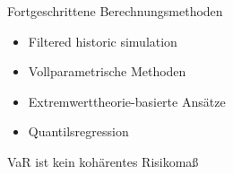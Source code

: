 \documentclass{beamer}
\begin{document}
\begin{frame}{Fortgeschrittene Berechnungsmethoden}
\begin{itemize}
\item Filtered historic simulation
\item Vollparametrische Methoden
\item Extremwerttheorie-basierte Ansätze
\item Quantilsregression
\end{itemize}
\end{frame}

\begin{frame}{VaR ist kein kohärentes Risikomaß}

\end{frame}

\begin{frame}{}

\end{frame}
\end{document}
